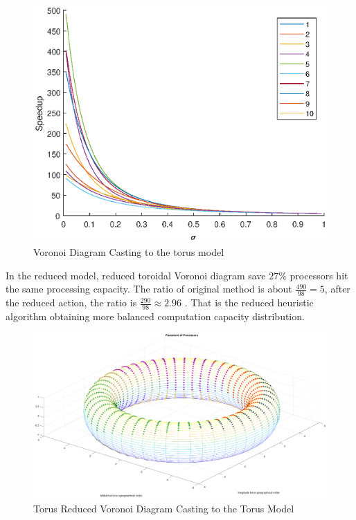 \begin{figure}[!ht]
\centering
\includegraphics[width=1\columnwidth]{figure/t_voronoi_speedup.eps}
\caption{Voronoi Diagram Casting to the torus model}
\label{fig:t_voronoi_torus}
\end{figure}
\newpage

In the reduced model, reduced toroidal Voronoi diagram save $27\%$ processors hit the same processing capacity.  The ratio of original method is about $\frac{490}{98} = 5$, after the reduced action, the ratio is $\frac{290}{98} \approx 2.96 $ . That is the reduced heuristic algorithm obtaining more balanced computation capacity distribution.

\begin{figure}[!ht]
\centering
\includegraphics[width=1\columnwidth]{figure/t_voronoi_torus_save.eps}
\caption{Torus Reduced Voronoi Diagram Casting to the Torus Model}
\label{fig:t_voronoi}
\end{figure}

